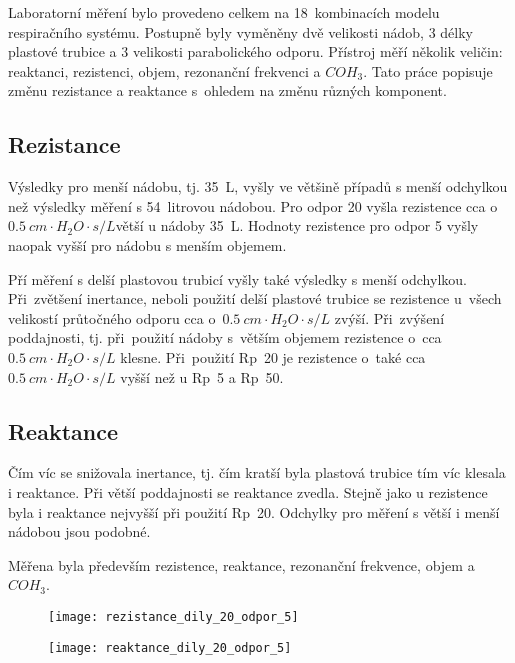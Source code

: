 \label{kap-vysledky}
Laboratorní měření bylo provedeno celkem na 18~kombinacích modelu respiračního systému. Postupně byly vyměněny dvě velikosti nádob, 3 délky plastové trubice a 3 velikosti parabolického odporu. Přístroj měří několik veličin: reaktanci, rezistenci, objem, rezonanční frekvenci a $COH_{3}$. Tato práce popisuje změnu rezistance a reaktance s~ohledem na změnu různých komponent.  

 
\subsection{Rezistance}

Výsledky pro menší nádobu, tj. \SI{35}{L}, vyšly ve většině případů s menší odchylkou než výsledky měření s 54~litrovou nádobou. Pro odpor 20 vyšla rezistence cca o $\SI{0,5}{cm\cdot H_{2}O \cdot s/L} $větší u nádoby \SI{35}{L}. Hodnoty rezistence pro odpor 5 vyšly naopak vyšší pro nádobu s menším objemem. 

Pří měření s delší plastovou trubicí vyšly také výsledky s menší odchylkou. 
Při~zvětšení inertance, neboli použití delší plastové trubice se rezistence u~všech velikostí průtočného odporu cca o~$\SI{0,5}{ cm\cdot H_{2}O \cdot s/L} $ zvýší. 
Při~zvýšení poddajnosti, tj. při~použití nádoby s~větším objemem rezistence o~cca  $\SI{0,5}{ cm\cdot H_{2}O \cdot s/L} $  klesne. 
Při~použití Rp~20 je rezistence o~také cca  $\SI{0,5}{ cm\cdot H_{2}O \cdot s/L} $  vyšší než u Rp~5 a Rp~50. 

\subsection{Reaktance}

Čím víc se snižovala inertance, tj. čím kratší byla plastová trubice tím víc klesala i reaktance. Při větší poddajnosti se reaktance zvedla. Stejně jako u rezistence byla i reaktance nejvyšší při použití Rp~20. Odchylky pro měření s větší i menší nádobou jsou podobné. 


Měřena byla především rezistence, reaktance, rezonanční frekvence, objem a $COH_{3}$. 



\begin{figure}
\centering
\begin{minipage}{.5\textwidth}
  \centering
  \texttt{[image: rezistance\_dily\_20\_odpor\_5]}
\captionsetup{justification=centering}
\end{minipage}%
\begin{minipage}{.5\textwidth}
  \centering
  \texttt{[image: reaktance\_dily\_20\_odpor\_5]}
\captionsetup{justification=centering}
\end{minipage}
\end{figure}


